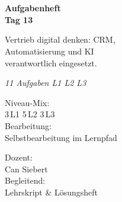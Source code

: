 \documentclass[11pt,a4paper,oneside]{article}
\newcommand{\caveatfontfallback}{\itshape}
\newcommand\caveatfont{\caveatfontfallback}%
\begin{document}
\begin{titlepage}
  \pagestyle{empty}
  \vspace*{1.5cm}
  \\[2pt]
  \noindent{\color{lpAccent}\rule{\linewidth}{1.2pt}}\\[4pt]

  \vspace{3cm}
  {\sffamily\fontsize{30}{34}\selectfont\bfseries\color{lpInk}Aufgabenheft\\Tag 13\par}

  \vspace{0.7cm}
  {\sffamily\large\color{lpGray}Vertrieb digital denken: CRM,\\Automatisierung und KI \textendash{}\\verantwortlich eingesetzt.\par}

  \vspace{1.5cm}
  {\caveatfont\LARGE\color{lpAmber}11 Aufgaben \textperiodcentered{} L1 \textperiodcentered{} L2 \textperiodcentered{} L3}\par

  \vfill

  \noindent\begin{minipage}{0.55\linewidth}
    {\sffamily\footnotesize\color{lpGray}Niveau-Mix:}\\
    {\sffamily\small\color{lpInk}3\,\textsf{L1} \textperiodcentered{} 5\,\textsf{L2} \textperiodcentered{} 3\,\textsf{L3}}\\[10pt]
    {\sffamily\footnotesize\color{lpGray}Bearbeitung:}\\
    {\sffamily\small\color{lpInk}Selbstbearbeitung im Lernpfad}
  \end{minipage}\hfill
  \begin{minipage}{0.4\linewidth}
    \raggedleft
    {\sffamily\footnotesize\color{lpGray}Dozent:}\\
    {\sffamily\small\color{lpInk}Can Siebert}\\[10pt]
    {\sffamily\footnotesize\color{lpGray}Begleitend:}\\
    {\sffamily\small\color{lpInk}Lehrskript \& Lösungsheft}
  \end{minipage}

  \vspace{0.5cm}
  \noindent{\color{lpAccent}\rule{\linewidth}{0.6pt}}
\end{titlepage}
\end{document}

